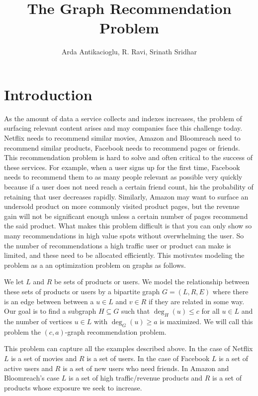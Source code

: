 \documentclass[11pt]{article}
\newcommand{\vs}{\vspace{0.2cm}}
\begin{document}
\title{The Graph Recommendation Problem}
\author{Arda Antikacioglu, R. Ravi, Srinath Sridhar}
\maketitle
\section{Introduction}
As the amount of data a service collects and indexes increases, the
problem of surfacing relevant content arises and may companies face
this challenge today. Netflix needs to recommend similar movies,
Amazon and Bloomreach need to recommend similar products, Facebook
needs to recommend pages or friends. This recommendation problem is
hard to solve and often critical to the success of these services. For
example, when a user signs up for the first time, Facebook needs to
recommend them to as many people relevant as possible very quickly
because if a user does not need reach a certain friend count, his the
probability of retaining that user decreases rapidly. Similarly,
Amazon may want to surface an undersold product on more commonly
visited product pages, but the revenue gain will not be significant
enough unless a certain number of pages recommend the said
product. What makes this problem difficult is that you can only show
so many recommendations in high value spots without overwhelming the
user. So the number of recommendations a high traffic user or product
can make is limited, and these need to be allocated efficiently. This
motivates modeling the problem as a an optimization problem on graphs
as follows. \vs

We let $L$ and $R$ be sets of products or users. We model the
relationship between these sets of products or users by a bipartite
graph $G=(L,R,E)$ where there is an edge between between a $u\in L$
and $v\in R$ if they are related in some way. Our goal is to find
a subgraph $H\subseteq G$ such that $\deg_{H}(u) \leq c$ for all $u\in
L$ and the number of vertices $u\in L$ with $\deg_{G}(u) \geq
a$ is maximized. We will call this problem the $(c,a)$-graph
recommendation problem.\vs

This problem can capture all the examples described above. In the case
of Netflix $L$ is a set of movies and $R$ is a set of users. In the
case of Facebook $L$ is a set of active users and $R$ is a set of new
users who need friends. In Amazon and Bloomreach's case $L$ is a set
of high traffic/revenue products and $R$ is a set of products whose
exposure we seek to increase. \vs
\end{document}
